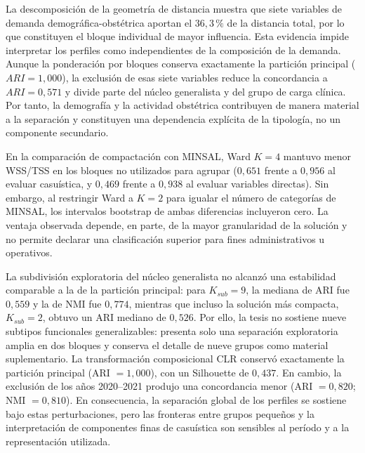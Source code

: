 La descomposición de la geometría de distancia muestra que siete variables de
demanda demográfica-obstétrica aportan el $36{,}3\,\%$ de la distancia total,
por lo que constituyen el bloque individual de mayor influencia. Esta evidencia
impide interpretar los perfiles como independientes de la composición de la
demanda. Aunque la ponderación por bloques conserva exactamente la partición
principal ($ARI=1{,}000$), la exclusión de esas siete variables reduce la
concordancia a $ARI=0{,}571$ y divide parte del núcleo generalista y del grupo
de carga clínica. Por tanto, la demografía y la actividad obstétrica contribuyen
de manera material a la separación y constituyen una dependencia explícita de
la tipología, no un componente secundario.

En la comparación de compactación con MINSAL, Ward $K=4$ mantuvo menor
WSS/TSS en los bloques no utilizados para agrupar ($0{,}651$ frente a $0{,}956$
al evaluar casuística, y $0{,}469$ frente a $0{,}938$ al evaluar variables
directas). Sin embargo, al restringir Ward a $K=2$ para igualar el número de
categorías de MINSAL, los intervalos bootstrap de ambas diferencias incluyeron
cero. La ventaja observada depende, en parte, de la mayor granularidad de la
solución y no permite declarar una clasificación superior para fines
administrativos u operativos.

La subdivisión exploratoria del núcleo generalista no alcanzó una estabilidad
comparable a la de la partición principal: para $K_{sub}=9$, la mediana de ARI fue $0{,}559$ y la
de NMI fue $0{,}774$, mientras que incluso la solución más compacta, $K_{sub}=2$, obtuvo un ARI
mediano de $0{,}526$. Por ello, la tesis no sostiene nueve subtipos funcionales
generalizables: presenta solo una separación exploratoria amplia en dos bloques
y conserva el detalle de nueve grupos como material suplementario.
La transformación composicional CLR conservó exactamente la partición principal
(ARI $=1{,}000$), con un Silhouette de $0{,}437$. En cambio, la exclusión de los
años 2020--2021 produjo una concordancia menor
(ARI $=0{,}820$; NMI $=0{,}810$). En consecuencia, la separación global de los
perfiles se sostiene bajo estas perturbaciones, pero las fronteras entre grupos
pequeños y la interpretación de componentes finas de casuística son sensibles al
período y a la representación utilizada.


